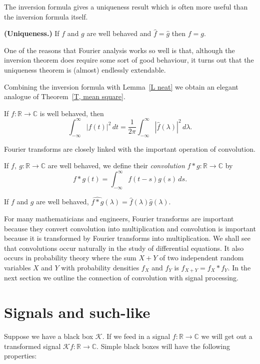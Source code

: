 The inversion formula gives a uniqueness result which
is often more useful than the inversion formula itself.
\begin{theorem}{\bf (Uniqueness.)} If $f$ and $g$
are well behaved and
$\hat{f}=\hat{g}$ then $f=g$.
\end{theorem}
One of the reasons that Fourier analysis works so well
is that, although the inversion theorem does require
some sort of good behaviour, it turns out that the
uniqueness theorem is (almost) endlessly extendable.

Combining the inversion formula with Lemma~\ref{L neat}
we obtain an elegant
analogue of Theorem~\ref{T, mean square}.
\begin{lemma} If $f:{\mathbb R}\rightarrow{\mathbb C}$
is well behaved, then
\[\int_{-\infty}^{\infty}|f(t)|^{2}\,dt
=\frac{1}{2\pi}\int_{-\infty}^{\infty}|\hat{f}(\lambda)|^{2}\,d\lambda.\]
\end{lemma}

Fourier transforms are closely linked with the
important operation of convolution.
\begin{definition} If $f,\ g:{\mathbb R}\rightarrow{\mathbb C}$
are well behaved, we define their \emph{convolution}
$f*g:{\mathbb R}\rightarrow{\mathbb C}$ by
\[f*g(t)=\int_{-\infty}^{\infty}f(t-s)g(s)\,ds.\]
\end{definition}
\begin{lemma} If $f$ and $g$ are well behaved,
$\widehat{f*g}(\lambda)=\hat{f}(\lambda)\hat{g}(\lambda)$.
\end{lemma}
For many mathematicians and engineers, Fourier transforms are
important because they convert convolution into multiplication
and convolution is important because it is transformed
by Fourier transforms into multiplication.
We shall see that convolutions occur naturally in the
study of differential equations.
It also occurs in probability theory where the sum $X+Y$
of two independent random variables $X$ and $Y$ with
probability densities $f_{X}$ and $f_{Y}$ is
$f_{X+Y}=f_{X}*f_{Y}$. In the next section
we outline the connection of convolution with signal
processing.
\section{Signals and such-like}\label{Green} Suppose we have a black box
${\mathcal K}$. If we feed in a signal
$f:{\mathbb R}\rightarrow{\mathbb C}$ we will get out
a transformed signal
${\mathcal K}f:{\mathbb R}\rightarrow{\mathbb C}$.
Simple black boxes will have the following properties:

